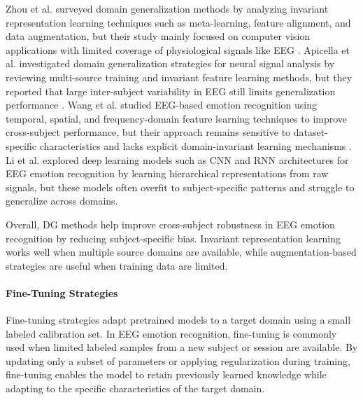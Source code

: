 \documentclass{WileyMSP-template}
\begin{document}
Zhou et al. \cite{zhou2022dgsurvey} surveyed domain generalization methods by analyzing invariant representation learning techniques such as meta-learning, feature alignment, and data augmentation, but their study mainly focused on computer vision applications with limited coverage of physiological signals like EEG . Apicella et al. \cite{apicella2024neucom_systematic} investigated domain generalization strategies for neural signal analysis by reviewing multi-source training and invariant feature learning methods, but they reported that large inter-subject variability in EEG still limits generalization performance . Wang et al. \cite{wang2024researchprogress} studied EEG-based emotion recognition using temporal, spatial, and frequency-domain feature learning techniques to improve cross-subject performance, but their approach remains sensitive to dataset-specific characteristics and lacks explicit domain-invariant learning mechanisms . Li et al. \cite{li2022tutorial} explored deep learning models such as CNN and RNN architectures for EEG emotion recognition by learning hierarchical representations from raw signals, but these models often overfit to subject-specific patterns and struggle to generalize across domains. 

Overall, DG methods help improve cross-subject robustness in EEG emotion recognition by reducing subject-specific bias. Invariant representation learning works well when multiple source domains are available, while augmentation-based strategies are useful when training data are limited.

\paragraph{Fine-Tuning Strategies}
Fine-tuning strategies adapt pretrained models to a target domain using a small labeled calibration set. In EEG emotion recognition, fine-tuning is commonly used when limited labeled samples from a new subject or session are available. By updating only a subset of parameters or applying regularization during training, fine-tuning enables the model to retain previously learned knowledge while adapting to the specific characteristics of the target domain.
\end{document}
